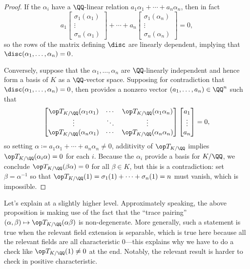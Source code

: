 \documentclass[../notes.tex]{subfiles}
\begin{document}
\begin{proof}
	If the $\alpha_i$ have a $\QQ$-linear relation $a_1\alpha_1+\cdots+a_n\alpha_n$, then in fact
	\[a_1\begin{bmatrix}
		\sigma_1(\alpha_1) \\ \vdots \\ \sigma_n(\alpha_1)
	\end{bmatrix}+\cdots+a_n\begin{bmatrix}
		\sigma_1(\alpha_n) \\ \vdots \\ \sigma_n(\alpha_n)
	\end{bmatrix}=0,\]
	so the rows of the matrix defining $\disc$ are linearly dependent, implying that $\disc(\alpha_1,\ldots,\alpha_n)=0$.

	Conversely, suppose that the $\alpha_1,\ldots,\alpha_n$ are $\QQ$-linearly independent and hence form a basis of $K$ as a $\QQ$-vector space. Supposing for contradiction that $\disc(\alpha_1,\ldots,\alpha_n)=0$, then  provides a nonzero vector $(a_1,\ldots,a_n)\in\QQ^n$ such that
	\[\begin{bmatrix}
		\op T_{K/\QQ}(\alpha_1\alpha_1) & \cdots & \op T_{K/\QQ}(\alpha_1\alpha_n) \\
		\vdots & \ddots & \vdots \\
		\op T_{K/\QQ}(\alpha_n\alpha_1) & \cdots & \op T_{K/\QQ}(\alpha_n\alpha_n)
	\end{bmatrix}\begin{bmatrix}
		a_1 \\ \vdots \\ a_n
	\end{bmatrix}=0,\]
	so setting $\alpha\coloneqq a_1\alpha_1+\cdots+a_n\alpha_n\ne0$, additivity of $\op T_{K/\QQ}$ implies $\op T_{K/\QQ}(\alpha_i\alpha)=0$ for each $i$. Because the $\alpha_i$ provide a basis for $K/\QQ$, we conclude $\op T_{K/\QQ}(\beta\alpha)=0$ for all $\beta\in K$, but this is  a contradiction: set $\beta=\alpha^{-1}$ so that $\op T_{K/\QQ}(1)=\sigma_1(1)+\cdots+\sigma_n(1)=n$ must vanish, which is impossible.
\end{proof}
\begin{remark}
	Let's explain  at a slightly higher level. Approximately speaking, the above proposition is making use of the fact that the ``trace pairing'' $(\alpha,\beta)\mapsto\op T_{K/\QQ}(\alpha\beta)$ is non-degen\-erate. More generally, such a statement is true when the relevant field extension is separable, which is true here because all the relevant fields are all characteristic $0$---this explains why we have to do a check like $\op T_{K/\QQ}(1)\ne0$ at the end. Notably, the relevant result is harder to check in positive characteristic.
\end{remark}
\end{document}
